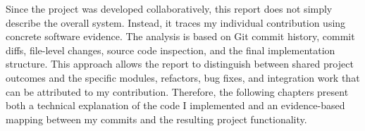 Since the project was developed collaboratively, this report does not simply describe the overall system. Instead, it traces my individual contribution using concrete software evidence. The analysis is based on Git commit history, commit diffs, file-level changes, source code inspection, and the final implementation structure. This approach allows the report to distinguish between shared project outcomes and the specific modules, refactors, bug fixes, and integration work that can be attributed to my contribution. Therefore, the following chapters present both a technical explanation of the code I implemented and an evidence-based mapping between my commits and the resulting project functionality.

